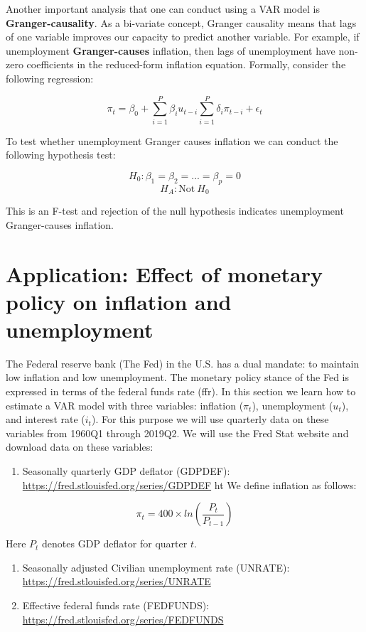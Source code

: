 \documentclass[]{book}
\providecommand{\tightlist}{%
  \setlength{\itemsep}{0pt}\setlength{\parskip}{0pt}}
\theoremstyle{definition}
\theoremstyle{definition}
\theoremstyle{definition}
\theoremstyle{remark}
\begin{document}
Another important analysis that one can conduct using a VAR model is \textbf{Granger-causality}. As a bi-variate concept, Granger causality means that lags of one variable improves our capacity to predict another variable. For example, if unemployment \textbf{Granger-causes} inflation, then lags of unemployment have non-zero coefficients in the reduced-form inflation equation. Formally, consider the following regression:

\[\pi_t=\beta_0 + \sum_{i=1}^{P} \beta_i u_{t-i} \sum_{i=1}^{P} \delta_i \pi_{t-i} + \epsilon_t\]

To test whether unemployment Granger causes inflation we can conduct the following hypothesis test:

\[H_0: \beta_1=\beta_2=...=\beta_p=0\]
\[H_A: \text{Not} \ H_0\]

This is an F-test and rejection of the null hypothesis indicates unemployment Granger-causes inflation.

\hypertarget{application-effect-of-monetary-policy-on-inflation-and-unemployment}{%
\section{Application: Effect of monetary policy on inflation and unemployment}\label{application-effect-of-monetary-policy-on-inflation-and-unemployment}}

The Federal reserve bank (The Fed) in the U.S. has a dual mandate: to maintain low inflation and low unemployment. The monetary policy stance of the Fed is expressed in terms of the federal funds rate (ffr). In this section we learn how to estimate a VAR model with three variables: inflation (\(\pi_t\)), unemployment (\(u_t\)), and interest rate (\(i_t\)). For this purpose we will use quarterly data on these variables from 1960Q1 through 2019Q2. We will use the Fred Stat website and download data on these variables:

\begin{enumerate}
\def\labelenumi{\arabic{enumi}.}
\tightlist
\item
  Seasonally quarterly GDP deflator (GDPDEF): \url{https://fred.stlouisfed.org/series/GDPDEF} ht
  We define inflation as follows:
\end{enumerate}

\[\pi_t = 400 \times ln\left(\frac{P_t}{P_{t-1}} \right)\]

Here \(P_t\) denotes GDP deflator for quarter \(t\).

\begin{enumerate}
\def\labelenumi{\arabic{enumi}.}
\setcounter{enumi}{1}
\item
  Seasonally adjusted Civilian unemployment rate (UNRATE): \url{https://fred.stlouisfed.org/series/UNRATE}
\item
  Effective federal funds rate (FEDFUNDS): \url{https://fred.stlouisfed.org/series/FEDFUNDS}
\end{enumerate}
\end{document}
